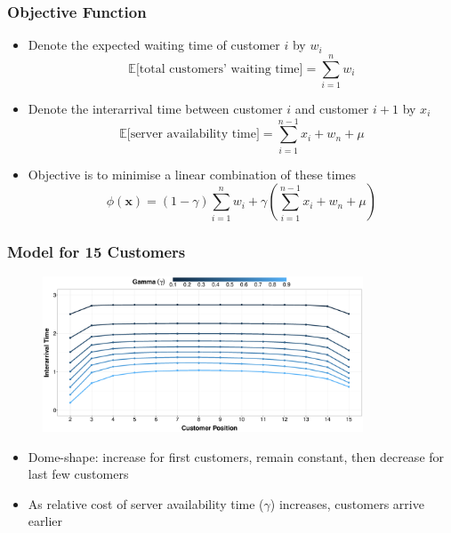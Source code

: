 \documentclass{beamer}
\begin{document}
\begin{frame}
	\frametitle{Objective Function}

	\begin{itemize}
		\item Denote the expected waiting time of customer $i$ by $w_{i}$
		\begin{equation*}
			\mathbb{E} \Big[ \text{total customers' waiting time} \Big] = \sum_{i = 1}^{n} w_{i}
		\end{equation*}
		\item Denote the interarrival time between customer $i$ and customer $i + 1$ by $x_{i}$
		\begin{equation*}
			\mathbb{E} \Big[ \text{server availability time} \Big] = \sum_{i = 1}^{n - 1} x_{i} + w_{n} + \mu
		\end{equation*}
		\item Objective is to minimise a linear combination of these times
		\begin{equation*}
			\phi (\mathbf{x}) = (1 - \gamma) \sum_{i = 1}^{n} w_{i} + \gamma \left( \sum_{i = 1}^{n - 1} x_{i} + w_{n} + \mu \right)
		\end{equation*}
	\end{itemize}
\end{frame}

\begin{frame}
	\frametitle{Model for 15 Customers}

	\begin{figure}
			\centering
			\includegraphics[width=0.85\textwidth]{Static_Line_Interarrival_Gamma.eps}
	\end{figure}

	\begin{itemize}
		\item \alert{Dome-shape}: increase for first customers, remain constant, then decrease for last few customers
		\item As relative cost of server availability time ($\gamma$) increases, customers arrive earlier
	\end{itemize}
\end{frame}
\end{document}

